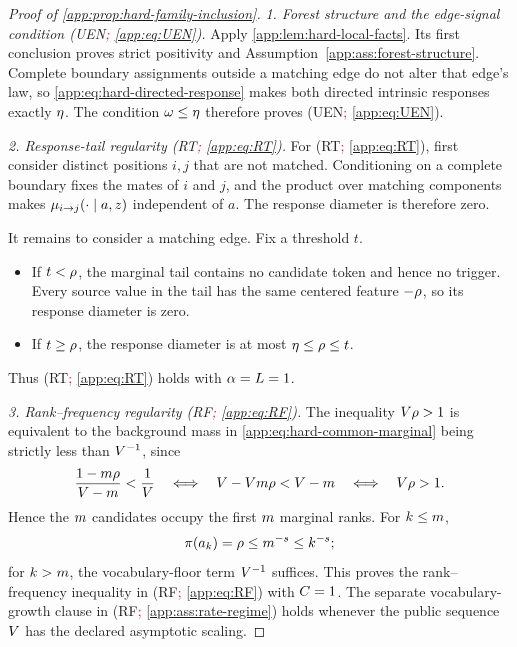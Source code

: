 \begin{proof}[Proof of \cref{app:prop:hard-family-inclusion}]

\emph{1. Forest structure and the edge-signal condition (UEN\textcolor{red}{; \cref{app:eq:UEN}}).}
Apply \cref{app:lem:hard-local-facts}.  Its first conclusion proves
strict positivity and Assumption~\ref{app:ass:forest-structure}.  Complete
boundary assignments outside a matching edge do not alter that edge's law,
so \eqref{app:eq:hard-directed-response} makes both directed intrinsic
responses exactly \(\eta\).  The condition
\(\omega\le\eta\) therefore proves (UEN\textcolor{red}{; \cref{app:eq:UEN}}).


\emph{2. Response-tail regularity (RT\textcolor{red}{; \cref{app:eq:RT}}).}
For (RT\textcolor{red}{; \cref{app:eq:RT}}), first consider distinct positions \(i,j\) that are not matched.
Conditioning on a complete boundary fixes the mates of \(i\) and \(j\), and
the product over matching components makes
\(\mu_{i\to j}(\cdot\mid a,z)\) independent of \(a\).  The response diameter is
therefore zero.

It remains to consider a matching edge.  Fix a threshold
\(t\).
\begin{itemize}
\item If \(t<\rho\), the marginal tail
contains no candidate token and hence no trigger.  Every source value in the
tail has the same centered feature \(-\rho\), so its response
diameter is zero.
\item If \(t\ge\rho\), the response diameter is at most
\(\eta\le\rho\le t\).
\end{itemize}
Thus (RT\textcolor{red}{; \cref{app:eq:RT}}) holds with
\(\alpha=L=1\).


\emph{3. Rank--frequency regularity (RF\textcolor{red}{; \cref{app:eq:RF}}).}
The inequality \(V\rho>1\) is equivalent to the
background mass in \eqref{app:eq:hard-common-marginal} being strictly less
than $V^{-1}$, since
\[
 \frac{1-m\rho}{V-m}
 <\frac1{V}
 \quad\Longleftrightarrow\quad
 V-Vm\rho
 <V-m
 \quad\Longleftrightarrow\quad
 V\rho>1.
\]  Hence the \(m\) candidates occupy
the first \(m\) marginal ranks.  For
\(k\le m\),
\[
 \pi(a_{k})=\rho
 \le m^{-s}
 \le k^{-s};
\]
for \(k>m\), the vocabulary-floor term
\(V^{-1}\) suffices.  This proves the rank--frequency inequality
in (RF\textcolor{red}{; \cref{app:eq:RF}}) with \(C=1\).  The separate vocabulary-growth clause
in (RF\textcolor{red}{; \cref{app:ass:rate-regime}}) holds whenever the public sequence \(V\) has the
declared asymptotic scaling.



\end{proof}
